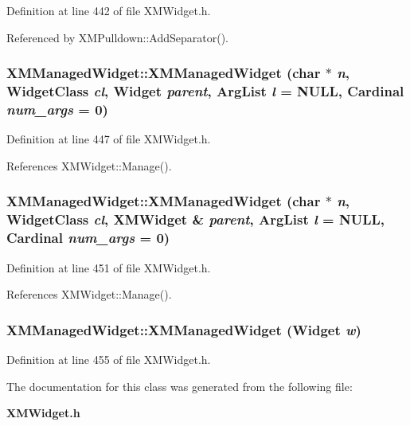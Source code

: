 Definition at line 442 of file XMWidget.h.

Referenced by XMPulldown::Add\-Separator().
\subsubsection{\setlength{\rightskip}{0pt plus 5cm}XMManaged\-Widget::XMManaged\-Widget (char $\ast$ {\em n}, Widget\-Class {\em cl}, Widget {\em parent}, Arg\-List {\em l} = NULL, Cardinal {\em num\_\-args} = 0)\hspace{0.3cm}{\tt  [inline]}}\label{classXMManagedWidget_a1}




Definition at line 447 of file XMWidget.h.

References XMWidget::Manage().
\subsubsection{\setlength{\rightskip}{0pt plus 5cm}XMManaged\-Widget::XMManaged\-Widget (char $\ast$ {\em n}, Widget\-Class {\em cl}, {\bf XMWidget} \& {\em parent}, Arg\-List {\em l} = NULL, Cardinal {\em num\_\-args} = 0)\hspace{0.3cm}{\tt  [inline]}}\label{classXMManagedWidget_a2}




Definition at line 451 of file XMWidget.h.

References XMWidget::Manage().
\subsubsection{\setlength{\rightskip}{0pt plus 5cm}XMManaged\-Widget::XMManaged\-Widget (Widget {\em w})\hspace{0.3cm}{\tt  [inline]}}\label{classXMManagedWidget_a3}




Definition at line 455 of file XMWidget.h.

The documentation for this class was generated from the following file:\begin{CompactItemize}
\item 
{\bf XMWidget.h}\end{CompactItemize}
